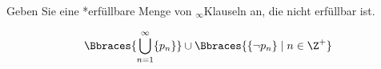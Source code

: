
\begin{exercise}[36]

 Geben Sie eine *erfüllbare Menge von $_\infty$Klauseln an, die nicht erfüllbar ist.

\end{exercise}


\begin{solution}

\begin{align*}
\Bbraces{\bigcup_{n=1}^\infty \{p_n\}} \cup \Bbraces{\{\neg p_n\} \mid n \in \Z^+}
\end{align*}

\end{solution}

